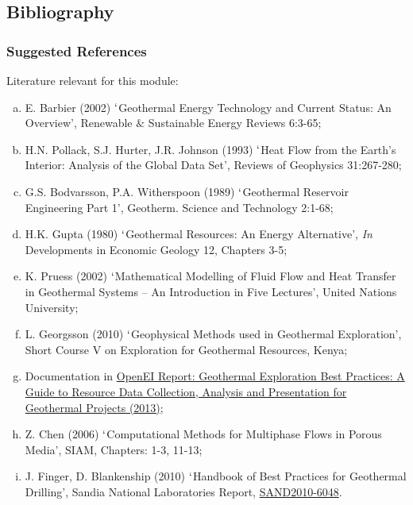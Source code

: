 \documentclass[10pt,compress,unknownkeysallowed]{beamer}
\begin{document}
 \subsection{Bibliography} 
   \begin{frame}
     \frametitle{Suggested References}\scriptsize
       Literature relevant for this module:
     \begin{enumerate}[(a)]\scriptsize
       \item E. Barbier (2002) $\lq$Geothermal Energy Technology and Current Status: An Overview', Renewable $\&$ Sustainable Energy Reviews 6:3-65;
       \item H.N. Pollack, S.J. Hurter, J.R. Johnson (1993) $\lq$Heat Flow from the Earth's Interior: Analysis of the Global Data Set', Reviews of Geophysics 31:267-280;
       \item G.S. Bodvarsson, P.A. Witherspoon (1989) $\lq$Geothermal Reservoir Engineering Part 1', Geotherm. Science and Technology 2:1-68;
       \item H.K. Gupta (1980) $\lq$Geothermal Resources: An Energy Alternative', {\it In} Developments in Economic Geology 12, Chapters 3-5;
       \item K. Pruess (2002) $\lq$Mathematical Modelling of Fluid Flow and Heat Transfer in Geothermal Systems -- An Introduction in Five Lectures', United Nations University;
       \item L. Georgsson (2010) $\lq$Geophysical Methods used in Geothermal Exploration', Short Course V on Exploration for Geothermal Resources, Kenya;
       \item Documentation in \href{http://en.openei.org/wiki/Geothermal_Exploration_Best_Practices:_A_Guide_to_Resource_Data_Collection,_Analysis_and_Presentation_for_Geothermal_Projects}{OpenEI Report: Geothermal Exploration Best Practices: A Guide to Resource Data Collection, Analysis and Presentation for Geothermal Projects (2013)};
       \item Z. Chen (2006) $\lq$Computational Methods for Multiphase Flows in Porous Media', SIAM, Chapters: 1-3, 11-13;
       \item J. Finger, D. Blankenship (2010) $\lq$Handbook of Best Practices for Geothermal Drilling', Sandia National Laboratories Report, \href{http://www1.eere.energy.gov/geothermal/pdfs/drillinghandbook.pdf}{SAND2010-6048}.
     \end{enumerate}
\end{frame}


\end{document}

